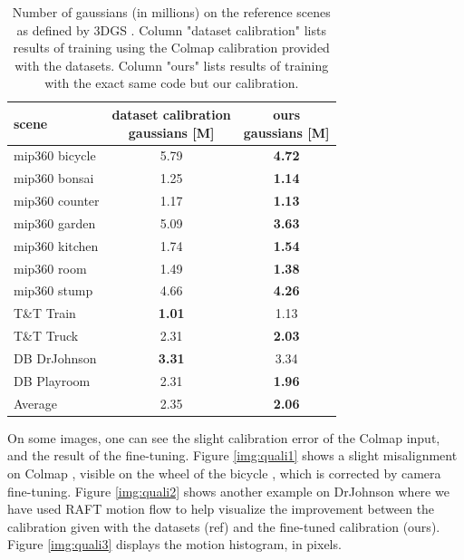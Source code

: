 \documentclass[a4paper,twoside,french]{article}
\begin{document}
  \begin{table}[h]
    \small
    \begin{center}
      {
      \begin{tabular}{|p{2.5cm}|c|c|}
        \hline
        scene & \shortstack{dataset calibration \\ gaussians [M]} & \shortstack{ours \\ gaussians [M]} \\
        \hline
        mip360 bicycle & 5.79 & \textbf{4.72} \\
        mip360 bonsai & 1.25 & \textbf{1.14} \\
        mip360 counter & 1.17 & \textbf{1.13} \\
        mip360 garden & 5.09 & \textbf{3.63} \\
        mip360 kitchen & 1.74 & \textbf{1.54} \\
        mip360 room & 1.49 & \textbf{1.38} \\
        mip360 stump & 4.66 & \textbf{4.26} \\
        T\&T Train & \textbf{1.01} & 1.13 \\
        T\&T Truck & 2.31 & \textbf{2.03} \\
        DB DrJohnson & \textbf{3.31} & 3.34 \\
        DB Playroom & 2.31 & \textbf{1.96} \\
        \hline
        Average & 2.35 & \textbf{2.06} \\
        \hline
        \end{tabular}
        }
        \caption{Number of gaussians (in millions) on the reference scenes as defined by 3DGS \cite{kerbl20233d}.
        Column "dataset calibration" lists results of training using the Colmap calibration provided with the datasets.
        Column "ours" lists results of training with the exact same code but our calibration.}
        \label{table:n_vertices}
      \end{center}
    \end{table}
    
  On some images, one can see the slight calibration error of the Colmap input, and the result of the fine-tuning.
	Figure \ref{img:quali1} shows a slight misalignment on Colmap \cite{schonberger2018robust}, visible on the wheel
	of the bicycle \cite{barron2022mip}, which is corrected by camera fine-tuning.
  Figure \ref{img:quali2} shows another example on DrJohnson \cite{HPPFDB18} where we have used RAFT \cite{DBLP:journals/corr/abs-2003-12039}
  motion flow to help visualize the improvement between the calibration given with the datasets (ref) and the fine-tuned
  calibration (ours). Figure \ref{img:quali3} displays the motion histogram, in pixels.
	
\end{document}
